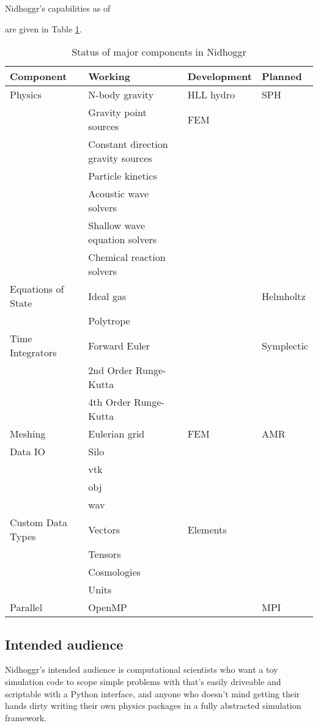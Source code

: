 \documentclass[12pt]{article}
\begin{document}
Nidhoggr's capabilities as of \date{\today} are given in Table \ref{tab:component-status}.
\begin{table}[h!]
	\centering
	\caption{Status of major components in Nidhoggr}
	\label{tab:component-status}
	\begin{tabular}{|l|l|l|l|}
		\hline
		\textbf{Component} & \textbf{Working} & \textbf{Development} & \textbf{Planned} \\
		\hline
		Physics & N-body gravity & HLL hydro & SPH\\ 
		& Gravity point sources & FEM &\\
		& Constant direction gravity sources &  &\\
		& Particle kinetics &  &\\
		& Acoustic wave solvers &  &\\
		& Shallow wave equation solvers &  &\\
		& Chemical reaction solvers &  &\\
		\hline
		Equations of State & Ideal gas &  & Helmholtz\\ 
		& Polytrope &  &\\
		\hline
		Time Integrators & Forward Euler &  & Symplectic\\ 
		& 2nd Order Runge-Kutta &  &\\
		& 4th Order Runge-Kutta &  &\\
		\hline
		Meshing & Eulerian grid & FEM & AMR\\
		\hline
		Data IO & Silo &  &\\
		& vtk &  &\\
		& obj &  &\\
		& wav &  &\\
		\hline
		Custom Data Types & Vectors & Elements &\\
		& Tensors &  &\\
		& Cosmologies & & \\
		& Units & & \\
		\hline
		Parallel & OpenMP & & MPI \\
		\hline
	\end{tabular}

\end{table}
	
	\subsection{Intended audience}
	
Nidhoggr's intended audience is computational scientists who want a toy simulation code to scope simple problems with that's easily driveable and scriptable with a Python interface, and anyone who doesn't mind getting their hands dirty writing their own physics packages in a fully abstracted simulation framework. 
\end{document}

